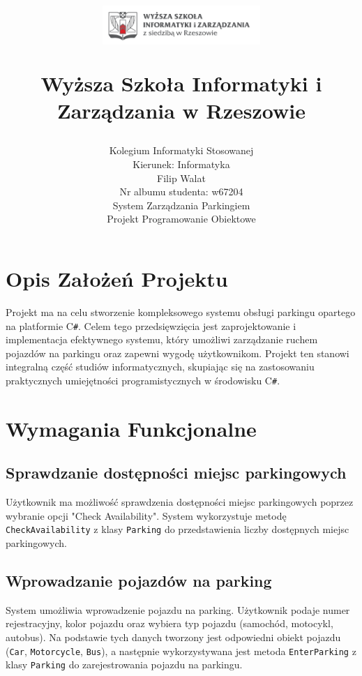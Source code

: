 \documentclass{article}
\title{
    \vspace{-2cm}
    \begin{flushright}
        \includegraphics[width=6cm]{photos/logoWSIiZ.PNG} 
    \end{flushright}
    \vspace{1cm}
    \textbf{Wyższa Szkoła Informatyki i Zarządzania w Rzeszowie} 
    \vspace{1cm}
}
\author{
    \Large Kolegium Informatyki Stosowanej \\
    \normalsize Kierunek: Informatyka \\
    \vspace{1cm}
    \normalsize Filip Walat \\
    \normalsize Nr albumu studenta: w67204 \\
    \vspace{1cm}
    \LARGE System Zarządzania Parkingiem \\
    \vspace{0.5cm}
    \Large Projekt Programowanie Obiektowe
}
\date{
    \vspace{10cm}
    \begin{center}
        \Large Rzeszów 2023
    \end{center}
    \vspace{7cm}
}
\begin{document}
\maketitle








\maketitle

\tableofcontents

\clearpage

\section{Opis Założeń Projektu}
Projekt ma na celu stworzenie kompleksowego systemu obsługi parkingu opartego na platformie C\texttt{\#}. Celem tego przedsięwzięcia jest zaprojektowanie i implementacja efektywnego systemu, który umożliwi zarządzanie ruchem pojazdów na parkingu oraz zapewni wygodę użytkownikom. Projekt ten stanowi integralną część studiów informatycznych, skupiając się na zastosowaniu praktycznych umiejętności programistycznych w środowisku C\texttt{\#}.

\section{Wymagania Funkcjonalne}

\subsection{Sprawdzanie dostępności miejsc parkingowych}
Użytkownik ma możliwość sprawdzenia dostępności miejsc parkingowych poprzez wybranie opcji "Check Availability". System wykorzystuje metodę \texttt{CheckAvailability} z klasy \texttt{Parking} do przedstawienia liczby dostępnych miejsc parkingowych.

\subsection{Wprowadzanie pojazdów na parking}
System umożliwia wprowadzenie pojazdu na parking. Użytkownik podaje numer rejestracyjny, kolor pojazdu oraz wybiera typ pojazdu (samochód, motocykl, autobus). Na podstawie tych danych tworzony jest odpowiedni obiekt pojazdu (\texttt{Car}, \texttt{Motorcycle}, \texttt{Bus}), a następnie wykorzystywana jest metoda \texttt{EnterParking} z klasy \texttt{Parking} do zarejestrowania pojazdu na parkingu.
\end{document}
